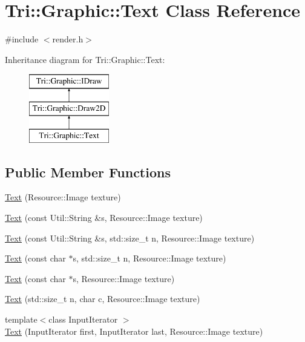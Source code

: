 \hypertarget{class_tri_1_1_graphic_1_1_text}{}\section{Tri\+:\+:Graphic\+:\+:Text Class Reference}
\label{class_tri_1_1_graphic_1_1_text}


{\ttfamily \#include $<$render.\+h$>$}

Inheritance diagram for Tri\+:\+:Graphic\+:\+:Text\+:\begin{figure}[H]
\begin{center}
\leavevmode
\includegraphics[height=3.000000cm]{class_tri_1_1_graphic_1_1_text}
\end{center}
\end{figure}
\subsection*{Public Member Functions}
\begin{DoxyCompactItemize}
\item 
\hyperlink{class_tri_1_1_graphic_1_1_text_a9854bdf2b097ae80215a8bfb1091bc9f}{Text} (Resource\+::\+Image texture)
\item 
\hyperlink{class_tri_1_1_graphic_1_1_text_a6e1854c52245f12ed44b65a8e27522c6}{Text} (const Util\+::\+String \&s, Resource\+::\+Image texture)
\item 
\hyperlink{class_tri_1_1_graphic_1_1_text_ae722b27dcdbdb07de73b218334b7c8a4}{Text} (const Util\+::\+String \&s, std\+::size\+\_\+t n, Resource\+::\+Image texture)
\item 
\hyperlink{class_tri_1_1_graphic_1_1_text_a6e01d3380be722b59da66a056c448671}{Text} (const char $\ast$s, std\+::size\+\_\+t n, Resource\+::\+Image texture)
\item 
\hyperlink{class_tri_1_1_graphic_1_1_text_a9a8d37cc5cc578d322aecf1a50b7f207}{Text} (const char $\ast$s, Resource\+::\+Image texture)
\item 
\hyperlink{class_tri_1_1_graphic_1_1_text_ab453c7ed9348c3f3d0f86e10c2fa8652}{Text} (std\+::size\+\_\+t n, char c, Resource\+::\+Image texture)
\item 
{\footnotesize template$<$class Input\+Iterator $>$ }\\\hyperlink{class_tri_1_1_graphic_1_1_text_a33c5dd1e43a3356b2f973e7f28362a87}{Text} (Input\+Iterator first, Input\+Iterator last, Resource\+::\+Image texture)
\end{DoxyCompactItemize}

